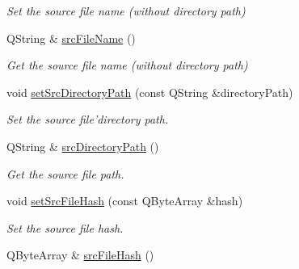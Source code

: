 \begin{DoxyCompactItemize}
\begin{DoxyCompactList}\small\item\em Set the source file name (without directory path) \end{DoxyCompactList}\item 
\hypertarget{classmdt_file_copier_item_a0bfdb3814bb1e9cea33bdd7826c03d76}{
QString \& \hyperlink{classmdt_file_copier_item_a0bfdb3814bb1e9cea33bdd7826c03d76}{srcFileName} ()}
\label{classmdt_file_copier_item_a0bfdb3814bb1e9cea33bdd7826c03d76}

\begin{DoxyCompactList}\small\item\em Get the source file name (without directory path) \end{DoxyCompactList}\item 
\hypertarget{classmdt_file_copier_item_a68310720d1cfeba70a616d81d12a9cde}{
void \hyperlink{classmdt_file_copier_item_a68310720d1cfeba70a616d81d12a9cde}{setSrcDirectoryPath} (const QString \&directoryPath)}
\label{classmdt_file_copier_item_a68310720d1cfeba70a616d81d12a9cde}

\begin{DoxyCompactList}\small\item\em Set the source file'directory path. \end{DoxyCompactList}\item 
\hypertarget{classmdt_file_copier_item_a2faf98128145c5ff1df336d0d5d91f47}{
QString \& \hyperlink{classmdt_file_copier_item_a2faf98128145c5ff1df336d0d5d91f47}{srcDirectoryPath} ()}
\label{classmdt_file_copier_item_a2faf98128145c5ff1df336d0d5d91f47}

\begin{DoxyCompactList}\small\item\em Get the source file path. \end{DoxyCompactList}\item 
\hypertarget{classmdt_file_copier_item_a5b8521d3acf4adffaf64f7dd5b2736b0}{
void \hyperlink{classmdt_file_copier_item_a5b8521d3acf4adffaf64f7dd5b2736b0}{setSrcFileHash} (const QByteArray \&hash)}
\label{classmdt_file_copier_item_a5b8521d3acf4adffaf64f7dd5b2736b0}

\begin{DoxyCompactList}\small\item\em Set the source file hash. \end{DoxyCompactList}\item 
\hypertarget{classmdt_file_copier_item_a0e8428a98488cb21aa47eb4f05dabf49}{
QByteArray \& \hyperlink{classmdt_file_copier_item_a0e8428a98488cb21aa47eb4f05dabf49}{srcFileHash} ()}
\label{classmdt_file_copier_item_a0e8428a98488cb21aa47eb4f05dabf49}


\end{DoxyCompactItemize}
